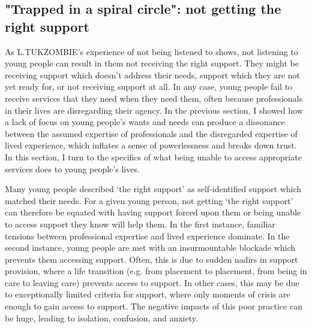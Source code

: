 \subsection{"Trapped in a spiral circle": not getting the right support}
As L.TUKZOMBIE's experience of not being listened to shows, not listening to young people can result in them not receiving the right support. They might be receiving support which doesn’t address their needs, support which they are not yet ready for, or not receiving support at all. In any case, young people fail to receive services that they need when they need them, often because professionals in their lives are disregarding their agency. In the previous section, I showed how a lack of focus on young people's wants and needs can produce a dissonance between the assumed expertise of professionals and the disregarded expertise of lived experience, which inflates a sense of powerlessness and breaks down trust. In this section, I turn to the specifics of what being unable to access appropriate services does to young people's lives.

Many young people described ‘the right support' as self-identified support which matched their needs. For a given young person, not getting `the right support' can therefore be equated with having support forced upon them or being unable to access support they know will help them. In the first instance, familiar tensions between professional expertise and lived experience dominate. In the second instance, young people are met with an insurmountable blockade which prevents them accessing support. Often, this is due to sudden nadirs in support provision, where a life transition (e.g. from placement to placement, from being in care to leaving care) prevents access to support. In other cases, this may be due to exceptionally limited criteria for support, where only moments of crisis are enough to gain access to support. The negative impacts of this poor practice can be huge, leading to isolation, confusion, and anxiety. 

